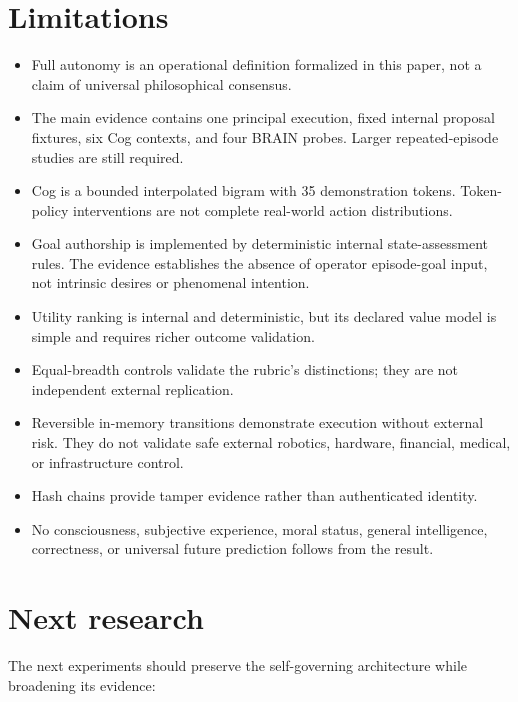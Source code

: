 \documentclass[11pt,a4paper]{article}
\begin{document}
\section{Limitations}
\begin{itemize}[nosep]
  \item Full autonomy is an operational definition formalized in this paper, not a claim of universal philosophical consensus.
  \item The main evidence contains one principal execution, fixed internal proposal fixtures, six Cog contexts, and four BRAIN probes. Larger repeated-episode studies are still required.
  \item Cog is a bounded interpolated bigram with 35 demonstration tokens. Token-policy interventions are not complete real-world action distributions.
  \item Goal authorship is implemented by deterministic internal state-assessment rules. The evidence establishes the absence of operator episode-goal input, not intrinsic desires or phenomenal intention.
  \item Utility ranking is internal and deterministic, but its declared value model is simple and requires richer outcome validation.
  \item Equal-breadth controls validate the rubric's distinctions; they are not independent external replication.
  \item Reversible in-memory transitions demonstrate execution without external risk. They do not validate safe external robotics, hardware, financial, medical, or infrastructure control.
  \item Hash chains provide tamper evidence rather than authenticated identity.
  \item No consciousness, subjective experience, moral status, general intelligence, correctness, or universal future prediction follows from the result.
\end{itemize}

\section{Next research}
The next experiments should preserve the self-governing architecture while broadening its evidence:
\end{document}
